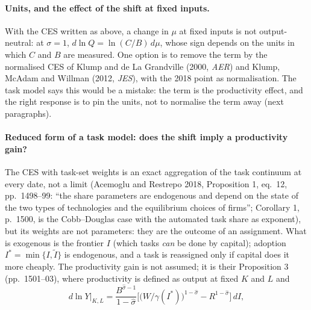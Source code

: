 \documentclass[11pt]{article}
\begin{document}
\paragraph{Units, and the effect of the shift at fixed inputs.} With the CES written as above, a change in $\mu$ at fixed inputs is not output-neutral: at $\sigma=1$, $d\ln Q=\ln(C/B)\,d\mu$, whose sign depends on the units in which $C$ and $B$ are measured. One option is to remove the term by the normalised CES of Klump and de La Grandville (2000, \emph{AER}) and Klump, McAdam and Willman (2012, \emph{JES}), with the 2018 point as normalisation. The task model says this would be a mistake: the term is the productivity effect, and the right response is to pin the units, not to normalise the term away (next paragraphs).

\paragraph{Reduced form of a task model: does the shift imply a productivity gain?} The CES with task-set weights is an exact aggregation of the task continuum at every date, not a limit (Acemoglu and Restrepo 2018, Proposition 1, eq.~12, pp.~1498--99: ``the share parameters are endogenous and depend on the state of the two types of technologies and the equilibrium choices of firms''; Corollary 1, p.~1500, is the Cobb--Douglas case with the automated task share as exponent), but its weights are not parameters: they are the outcome of an assignment. What is exogenous is the frontier $I$ (which tasks \emph{can} be done by capital); adoption $I^*=\min\{I,\tilde I\}$ is endogenous, and a task is reassigned only if capital does it more cheaply. The productivity gain is not assumed; it is their Proposition 3 (pp.~1501--03), where productivity is defined as output at fixed $K$ and $L$ and
\[
d\ln Y|_{K,L} = \frac{B^{\hat\sigma-1}}{1-\hat\sigma}\Big[\big(W/\gamma(I^*)\big)^{1-\hat\sigma} - R^{1-\hat\sigma}\Big]\,dI ,
\]
\end{document}
